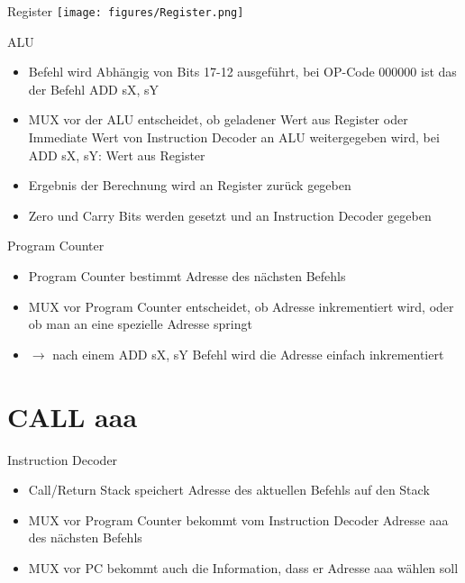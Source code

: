 \documentclass[10pt, t,
aspectratio=169,%
usenames,
dvipsnames,
]{beamer}
\begin{document}
	\begin{frame}{Register}
		\texttt{[image: figures/Register.png]}
	\end{frame}
	
	\begin{frame}{ALU}
		\begin{itemize}
			\item Befehl wird Abhängig von Bits 17-12 ausgeführt, bei OP-Code 000000 ist das der Befehl ADD sX, sY
			\item MUX vor der ALU entscheidet, ob geladener Wert aus Register oder Immediate Wert von Instruction Decoder an ALU weitergegeben wird, bei ADD sX, sY: Wert aus Register
			\item Ergebnis der Berechnung wird an Register zurück gegeben
			\item Zero und Carry Bits werden gesetzt und an Instruction Decoder gegeben
		\end{itemize}
	\end{frame}
	
	\begin{frame}{Program Counter}
		\begin{itemize}
			\item Program Counter bestimmt Adresse des nächsten Befehls
			\item MUX vor Program Counter entscheidet, ob Adresse inkrementiert wird, oder ob man an eine spezielle Adresse springt
			\item $\rightarrow$ nach einem ADD sX, sY Befehl wird die Adresse einfach inkrementiert
			
		\end{itemize}
	\end{frame}

	\section{CALL aaa}

	\begin{frame}{Instruction Decoder}
		\begin{itemize}
			\item Call/Return Stack speichert Adresse des aktuellen Befehls auf den Stack
			\item MUX vor Program Counter bekommt vom Instruction Decoder Adresse aaa des nächsten Befehls
			\item MUX vor PC bekommt auch die Information, dass er Adresse aaa wählen soll
		\end{itemize}
	\end{frame}
\end{document}
